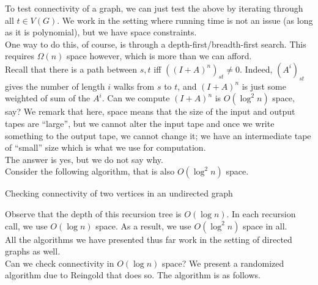 			To test connectivity of a graph, we can just test the above by iterating through all $t \in V(G)$. We work in the setting where running time is not an issue (as long as it is polynomial), but we have space constraints.\\
			
			One way to do this, of course, is through a depth-first/breadth-first search. This requires $\Omega(n)$ space however, which is more than we can afford.\\

			Recall that there is a path between $s,t$ iff $((I+A)^n)_{st} \ne 0$. Indeed, $(A^i)_{st}$ gives the number of length $i$ walks from $s$ to $t$, and $(I+A)^n$ is just some weighted of sum of the $A^i$. Can we compute $(I+A)^n$ is $O(\log^2 n)$ space, say? We remark that here, space means that the size of the input and output tapes are ``large'', but we cannot alter the input tape and once we write something to the output tape, we cannot change it; we have an intermediate tape of ``small'' size which is what we use for computation.\\
			The answer is yes, but we do not say why.\\

			Consider the following algorithm, that is also $O(\log^2 n)$ space.\\

			\begin{algorithm}[H]
				\DontPrintSemicolon
				\SetNoFillComment
				 {
					 {
					}
					 {
					}
				}
				\caption{Checking connectivity of two vertices in an undirected graph}
			\end{algorithm}
			Observe that the depth of this recursion tree is $O(\log n)$. In each recursion call, we use $O(\log n)$ space. As a result, we use $O(\log^2 n)$ space in all.\\

			All the algorithms we have presented thus far work in the setting of directed graphs as well.\\
			Can we check connectivity in $O(\log n)$ space? We present a randomized algorithm due to Reingold \cite{reingold-undirected-conn-logspace} that does so. The algorithm is as follows.\\

